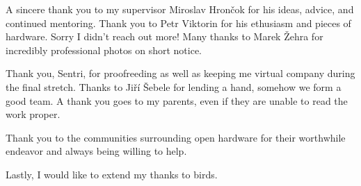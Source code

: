 A sincere thank you to my supervisor Miroslav Hrončok for his ideas, advice, and continued mentoring.  Thank you to Petr Viktorin for his ethusiasm and pieces of hardware.  Sorry I didn't reach out more!  Many thanks to Marek Žehra for incredibly professional photos on short notice.

Thank you, Sentri, for proofreeding as well as keeping me virtual company during the final stretch.  Thanks to Jiří Šebele for lending a hand, somehow we form a good team.  A thank you goes to my parents, even if they are unable to read the work proper.

Thank you to the communities surrounding open hardware for their worthwhile endeavor and always being willing to help.

Lastly, I would like to extend my thanks to birds.

